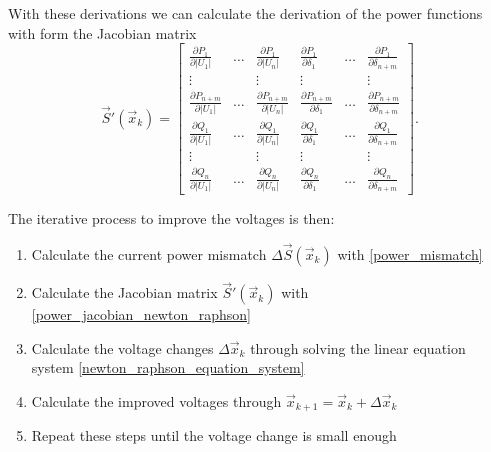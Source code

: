 With these derivations we can calculate the derivation of the power functions with form the Jacobian matrix
\begin{equation}
	\vec S' (\vec x_k) = 
	\begin{bmatrix}
		\frac{\partial P_1}{\partial |U_1|}	& \hdots	& \frac{\partial P_1}{\partial |U_n|}	& \frac{\partial P_1}{\partial \delta_1}	& \hdots	& \frac{\partial P_1}{\partial \delta_{n + m}} \\
		\vdots								&			& \vdots								& \vdots									&			& \vdots \\
		\frac{\partial P_{n + m}}{\partial |U_1|}	& \hdots	& \frac{\partial P_{n + m}}{\partial |U_n|}	& \frac{\partial P_{n + m}}{\partial \delta_1}	& \hdots	& \frac{\partial P_{n + m}}{\partial \delta_{n + m}} \\
		\frac{\partial Q_1}{\partial |U_1|}	& \hdots	& \frac{\partial Q_1}{\partial |U_n|}	& \frac{\partial Q_1}{\partial \delta_1}	& \hdots	& \frac{\partial Q_1}{\partial \delta_{n + m}} \\
		\vdots								&			& \vdots								& \vdots									&			& \vdots \\
		\frac{\partial Q_n}{\partial |U_1|}	& \hdots	& \frac{\partial Q_n}{\partial |U_n|}	& \frac{\partial Q_n}{\partial \delta_1}	& \hdots	& \frac{\partial Q_n}{\partial \delta_{n + m}}
	\end{bmatrix}.
	\label{eq:power_jacobian_newton_raphson}
\end{equation}

The iterative process to improve the voltages is then:
\begin{enumerate}
	\item Calculate the current power mismatch $\Delta \vec S (\vec x_k)$ with \eqref{power_mismatch}
	\item Calculate the Jacobian matrix $\vec S' (\vec x_k)$ with \eqref{power_jacobian_newton_raphson}
	\item Calculate the voltage changes $\Delta \vec x_k$ through solving the linear equation system \eqref{newton_raphson_equation_system}
	\item Calculate the improved voltages through $\vec x_{k + 1} = \vec x_k + \Delta \vec x_k$
	\item Repeat these steps until the voltage change is small enough
\end{enumerate}

